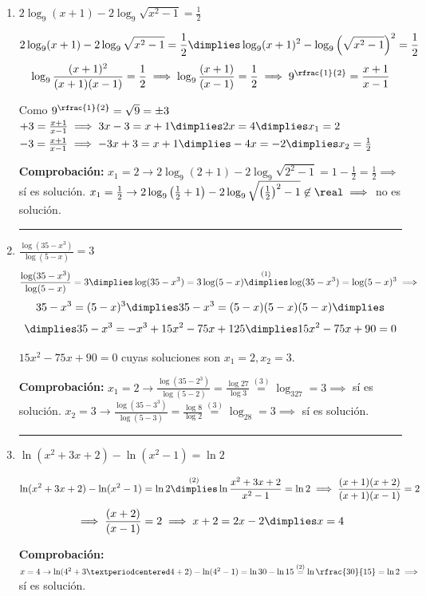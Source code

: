 \documentclass[palatino,nosec,nochap]{Docencia}
\begin{document}
\begin{enumerate}
	\hrule
	\item $\displaystyle 2\log_9(x+1) - 2\log_9\sqrt{x^2-1} = \frac{1}{2}$
	
	\[
	 	2\log_9(x+1) - 2\log_9\sqrt{x^2-1} = \frac{1}{2} \dimplies \log_9(x+1)^2-\log_9\left(\sqrt{x^2-1}\right)^2 = \frac{1}{2}
	\]
	\[
		\log_9\frac{ (x+1)^2}{(x+1)(x-1)} = \frac{1}{2} \implies \log_9 \frac{(x+1)}{(x-1)} = \frac{1}{2} \implies 9^{\rfrac{1}{2}} = \frac{x+1}{x-1}
	\]

	Como $9^{\rfrac{1}{2}} = \sqrt{9} = \pm3$
	\subitem $+3 = \frac{x+1}{x-1} \implies 3x-3=x+1 \dimplies 2x=4 \dimplies x_1=2$
	\subitem $-3 = \frac{x+1}{x-1} \implies -3x+3=x+1 \dimplies -4x=-2 \dimplies x_2=\frac{1}{2}$

	\textbf{Comprobación:}
	\subitem $x_1=2 \to 2\log_9(2+1) - 2\log_9\sqrt{2^2-1} = 1-\frac{1}{2} = \frac{1}{2} \implies $ sí es solución.
	\subitem $x_1=\frac{1}{2} \to 2\log_9\left(\frac{1}{2}+1\right) - 2\log_9\sqrt{\left(\frac{1}{2}\right)^2-1} \not\in\real \implies $ no es solución.

	\hrule
	\item $\displaystyle\frac{\log(35-x^3)}{\log(5-x)} = 3$
	\[
		\frac{\log(35-x^3)}{\log(5-x)} = 3 \dimplies \log(35-x^3)=3\log(5-x) \overset{(1)}{\dimplies} \log(35-x^3)=\log(5-x)^3 \implies 
	\]
	\[35-x^3 = (5-x)^3 \dimplies 35-x^3 = (5-x)(5-x)(5-x) \dimplies \]
	\[ \dimplies 35-x^3 = -x^3+15x^2-75x+125 \dimplies 15x^2-75x+90 = 0
	\]

	$15x^2-75x+90 = 0$ cuyas soluciones son $x_1=2, x_2=3$.

	\textbf{Comprobación:}
	\subitem $\displaystyle x_1=2 \to \frac{\log(35-2^3)}{\log(5-2)} = \frac{\log27}{\log3}\overset{(3)}{=}\log_327=3 \implies $ sí es solución.
	\subitem $\displaystyle x_2=3 \to \frac{\log(35-3^3)}{\log(5-3)} = \frac{\log8}{\log2} \overset{(3)}{=} \log_28=3\implies $ sí es solución.

	\vspace{0.5cm}
	\hrule
	\item $\displaystyle \ln(x^2+3x+2) - \ln (x^2-1) = \ln 2$
	
	\[
		\ln(x^2+3x+2) - \ln (x^2-1) = \ln 2 \overset{(2)}{\dimplies} \ln\frac{x^2+3x+2}{x^2-1} = \ln2 \implies \frac{(x+1)(x+2)}{(x+1)(x-1)} = 2 \]
		\[\implies \frac{(x+2)}{(x-1)} = 2 \implies x+2=2x-2 \dimplies x=4
	\]

	\textbf{Comprobación:}
	\subitem $x=4 \to \ln(4^2+3·4+2) - \ln (4^2-1) = \ln30 - \ln15 \overset{(2)}{=} \ln\rfrac{30}{15} = \ln 2\implies$ sí es solución.
	

\end{enumerate}
\end{document}
